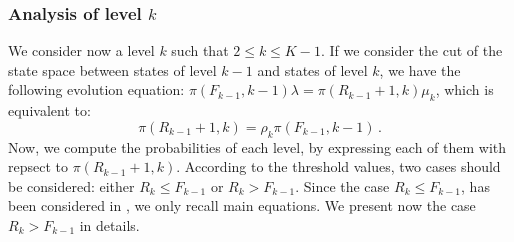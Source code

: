 \documentclass[conference]{IEEEtran}
\begin{document}


\subsubsection{Analysis of level $k$}
We consider now a level $k$ such that $2 \leq  k \leq K-1$.
If we consider the cut of the state space between states of level $k-1$ and states of level $k$,  we have
the following  evolution equation: $\pi(F_{k-1},k-1) \lambda=  \pi(R_{k-1}+1,k) \mu_k$, which is equivalent to:
\begin{equation}
\pi(R_{k-1}+1,k)= \rho_k \pi(F_{k-1},k-1) \, .
\label{eq14b}
\end{equation}
Now, we compute the probabilities of each level, by
expressing  each of them with repsect to $\pi(R_{k-1}+1,k)$.
According to the threshold values,
two cases should be considered:
either $R_{k} \leq F_{k-1}$ or $R_{k} > F_{k-1}$. Since the case  $R_{k} \leq F_{k-1}$, has been considered in \cite{le2000simple},
we only recall main equations.
We present now the case $R_{k} > F_{k-1}$ in details.

\end{document}

